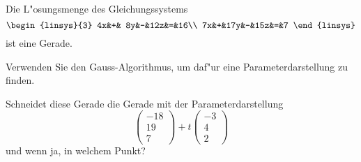 Die L"osungsmenge des Gleichungssystems 
\[
\begin{linsys}{3}
4x&+& 8y&-&12z&=&16\\
7x&+&17y&-&15z&=&7
\end{linsys}
\]
ist eine Gerade.
\begin{teilaufgaben}
\item
Verwenden Sie den Gauss-Algorithmus, um daf"ur eine Parameterdarstellung
zu finden.
\item
Schneidet diese Gerade die Gerade mit der Parameterdarstellung
\[
\begin{pmatrix}
-18\\
 19\\
  7
\end{pmatrix}
+t
\begin{pmatrix}
-3\\
 4\\
 2
\end{pmatrix}
\]
und wenn ja, in welchem Punkt?
\end{teilaufgaben}

